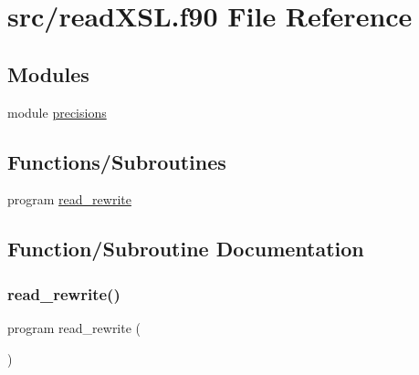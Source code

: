 \hypertarget{readXSL_8f90}{}\section{src/read\+X\+SL.f90 File Reference}
\label{readXSL_8f90}
\subsection*{Modules}
\begin{DoxyCompactItemize}
\item 
module \mbox{\hyperlink{namespaceprecisions}{precisions}}
\end{DoxyCompactItemize}
\subsection*{Functions/\+Subroutines}
\begin{DoxyCompactItemize}
\item 
program \mbox{\hyperlink{readXSL_8f90_a3972b22411c7969313c9a6e2dd059cc6}{read\+\_\+rewrite}}
\end{DoxyCompactItemize}


\subsection{Function/\+Subroutine Documentation}
\mbox{\label{readXSL_8f90_a3972b22411c7969313c9a6e2dd059cc6}} 
\subsubsection{\texorpdfstring{read\+\_\+rewrite()}{read\_rewrite()}}
{\footnotesize\ttfamily program read\+\_\+rewrite (\begin{DoxyParamCaption}{ }\end{DoxyParamCaption})}

